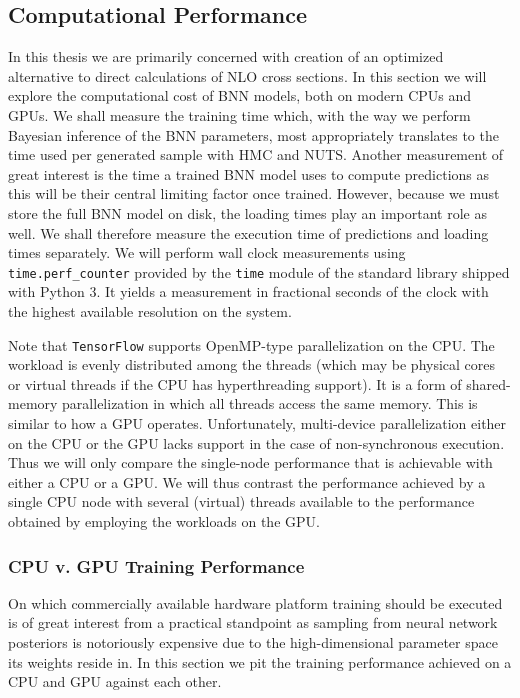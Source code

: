 \subsection{Computational Performance}
In this thesis we are primarily concerned with creation of an optimized alternative to direct calculations of NLO cross sections.
In this section we will explore the computational cost of BNN models, both on modern CPUs and GPUs. We shall measure the training time which, with the way we perform Bayesian inference of the BNN parameters, most appropriately translates to the time used per generated sample with HMC and NUTS. Another measurement of great interest is the time a trained BNN model uses to compute predictions as this will be their central limiting factor once trained. However, because we must store the full BNN model on disk, the loading times play an important role as well. We shall therefore measure the execution time of predictions and loading times separately.
We will perform wall clock measurements using {\tt time.perf\_counter} provided by the {\tt time} module of the standard library shipped with Python 3. It yields a measurement in fractional seconds of the clock with the highest available resolution on the system.

Note that {\tt TensorFlow} supports OpenMP-type parallelization on the CPU. The workload is evenly distributed among the threads (which may be physical cores or virtual threads if the CPU has hyperthreading support). It is a form of shared-memory parallelization in which all threads access the same memory. This is similar to how a GPU operates.
Unfortunately, multi-device parallelization either on the CPU or the GPU lacks support in the case of non-synchronous execution. Thus we will only compare the single-node performance that is achievable with either a CPU or a GPU. We will thus contrast the performance achieved by a single CPU node with several (virtual) threads available to the performance obtained by employing the workloads on the GPU.

\subsubsection{CPU v. GPU Training Performance}
On which commercially available hardware platform training should be executed is of great interest from a practical standpoint as 
sampling from neural network posteriors is notoriously expensive due to the high-dimensional parameter space its weights reside in.
In this section we pit the training performance achieved on a CPU and GPU against each other.

